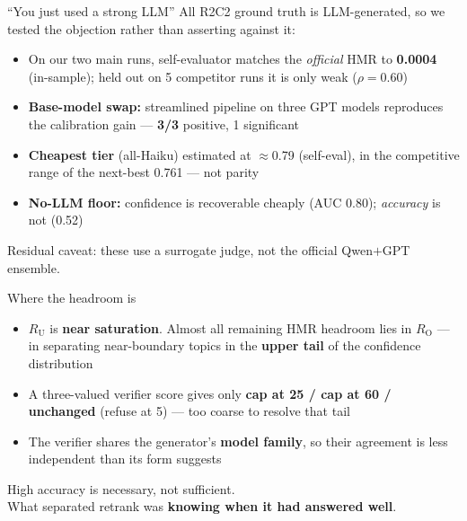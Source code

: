 \documentclass[aspectratio=169,11pt]{beamer}
\newcommand{\HMR}{\textsc{HMR}}
\newcommand{\RO}{R_{\mathrm{O}}}
\newcommand{\RU}{R_{\mathrm{U}}}
\newcommand{\hl}[1]{{\color{accent}\textbf{#1}}}
\newcommand{\gd}[1]{{\color{good}\textbf{#1}}}
\begin{document}
\begin{frame}{``You just used a strong LLM''}
All R2C2 ground truth is LLM-generated, so we tested the objection rather than
asserting against it:
\vspace{0.6em}
\begin{itemize}\setlength\itemsep{0.45em}
  \item On our two main runs, self-evaluator matches the \emph{official} \HMR{} to \textbf{0.0004} (in-sample);
        held out on 5 competitor runs it is only weak ($\rho{=}0.60$)
  \item \textbf{Base-model swap:} streamlined pipeline on three GPT models reproduces
        the calibration gain --- \gd{3/3} positive, 1 significant
  \item \textbf{Cheapest tier} (all-Haiku) estimated at $\approx$0.79 (self-eval), in the
        competitive range of the next-best 0.761 --- not parity
  \item \textbf{No-LLM floor:} confidence is recoverable cheaply (AUC 0.80);
        \emph{accuracy} is not (0.52)
\end{itemize}
\vspace{0.5em}
{\small Residual caveat: these use a surrogate judge, not the official Qwen$+$GPT ensemble.}
\end{frame}

\begin{frame}{Where the headroom is}
\begin{itemize}\setlength\itemsep{0.5em}
  \item $\RU$ is \textbf{near saturation}. Almost all remaining \HMR{} headroom lies in $\RO$ --- in separating
        near-boundary topics in the \hl{upper tail} of the confidence distribution
  \item A three-valued verifier score gives only \textbf{cap at 25 / cap at 60 / unchanged}
        (refuse at 5) --- too coarse to resolve that tail
  \item The verifier shares the generator's \textbf{model family}, so their agreement is
        less independent than its form suggests
\end{itemize}
\vspace{0.8em}
\begin{block}{}
\centering\large
High accuracy is necessary, not sufficient.\\
What separated retrank was \textbf{knowing when it had answered well}.
\end{block}
\end{frame}
\end{document}
